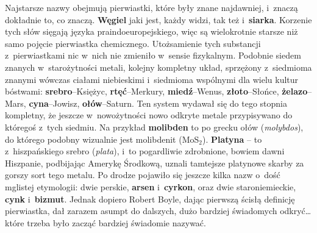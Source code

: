 Najstarsze nazwy obejmują pierwiastki, które były znane najdawniej, i~znaczą dokładnie to, co znaczą. \textbf{Węgiel} jaki jest, każdy widzi,
tak też i~\textbf{siarka}. Korzenie tych słów sięgają języka
praindoeuropejskiego, więc są wielokrotnie starsze niż samo pojęcie
pierwiastka chemicznego. Utożsamienie tych substancji z~pierwiastkami
nic w~nich nie zmieniło w~sensie fizykalnym. Podobnie siedem znanych w~starożytności metali, kolejny kompletny układ, sprzężony z~siedmioma
znanymi wówczas ciałami niebieskimi i~siedmioma wspólnymi dla wielu
kultur bóstwami: \textbf{srebro}--Księżyc, \textbf{rtęć}--Merkury,
\textbf{miedź}--Wenus, \textbf{złoto}--Słońce, \textbf{żelazo}--Mars,
\textbf{cyna}--Jowisz, \textbf{ołów}--Saturn. Ten system wydawał się do
tego stopnia kompletny, że jeszcze w~nowożytności nowo odkryte metale
przypisywano do któregoś z~tych siedmiu. Na przykład \textbf{molibden}
to po grecku ołów (\emph{molybdos}), do którego podobny wizualnie jest
molibdenit (MoS$_2$). \textbf{Platyna} -- to z~hiszpańskiego srebro
(\emph{plata}), i~to pogardliwie zdrobnione, bowiem dawni Hiszpanie,
podbijając Amerykę Środkową, uznali tamtejsze platynowe skarby za gorszy
sort tego metalu. Po drodze pojawiło się jeszcze kilka nazw o~dość
mglistej etymologii: dwie perskie, \textbf{arsen} i~\textbf{cyrkon},
oraz dwie staroniemieckie, \textbf{cynk} i~\textbf{bizmut}. Jednak
dopiero Robert Boyle, dając pierwszą ścisłą definicję pierwiastka, dał
zarazem asumpt do dalszych, dużo bardziej świadomych odkryć\ldots{}
które trzeba było zacząć bardziej świadomie nazywać.


